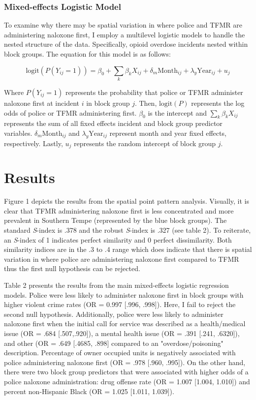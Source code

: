 \subsubsection{Mixed-effects Logistic Model}
To examine why there may be spatial variation in where police and TFMR are administering naloxone first, I employ a multilevel logistic models to handle the nested structure of the data. Specifically, opioid overdose incidents nested within block groups. The equation for this model is as follows:

\[
\text{logit}\left(P(Y_{ij} = 1)\right) = \beta_0 + \sum_{k} \beta_k X_{ij} + \delta_m \text{Month}_{ij} + \lambda_y \text{Year}_{ij} + u_j
\]

\noindent Where \(P(Y_{ij} = 1)\) represents the probability that police or TFMR administer naloxone first at incident \(i\) in block group \(j\). Then, \(\text{logit}(P)\) represents the log odds of police or TFMR administering first. \(\beta_0\) is the intercept and \(\sum_{k} \beta_k X_{ij}\) represents the sum of all fixed effects incident and block group predictor variables. \(\delta_m \text{Month}_{ij}\) and \(\lambda_y \text{Year}_{ij}\) represent month and year fixed effects, respectively. Lastly, \(u_j\) represents the random intercept of block group \(j\).

\section{Results}

Figure 1 depicts the results from the spatial point pattern analysis. Visually, it is clear that TFMR administering naloxone first is less concentrated and more prevalent in Southern Tempe (represented by the blue block groups). The standard \textit{S}-index is .378 and the robust \textit{S}-index is .327 (see table 2). To reiterate, an \textit{S}-index of 1 indicates perfect similarity and 0 perfect dissimilarity. Both similarity indices are in the .3 to .4 range which does indicate that there is spatial variation in where police are administering naloxone first compared to TFMR thus the first null hypothesis can be rejected.

Table 2 presents the results from the main mixed-effects logistic regression models. Police were less likely to administer naloxone first in block groups with higher violent crime rates (OR = 0.997 [.996, .998]). Here, I fail to reject the second null hypothesis. Additionally, police were less likely to administer naloxone first when the initial call for service was described as a health/medical issue (OR = .684 [.507,.920]), a mental health issue (OR = .391 [.241, .6320]), and other (OR = .649 [.4685, .898] compared to an "overdose/poisoning" description. Percentage of owner occupied units is negatively associated with police administering naloxone first (OR = .978 [.960, .995]). On the other hand, there were two block group predictors that were associated with higher odds of a police naloxone administration: drug offense rate (OR = 1.007 [1.004, 1.010]) and percent non-Hispanic Black (OR = 1.025 [1.011, 1.039]).

